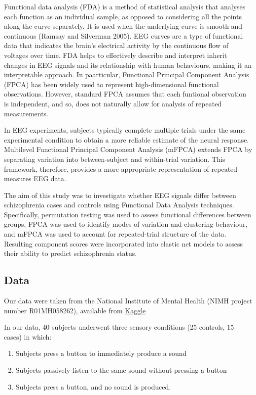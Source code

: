 \documentclass{article}
\providecommand{\tightlist}{%
  \setlength{\itemsep}{0pt}\setlength{\parskip}{0pt}}
\begin{document}
Functional data analysis (FDA) is a method of statistical analysis that
analyses each function as an individual sample, as opposed to
considering all the points along the curve separately. It is used when
the underlying curve is smooth and continuous (Ramsay and Silverman
2005). EEG curves are a type of functional data that indicates the
brain's electrical activity by the continuous flow of voltages over
time. FDA helps to effectively describe and interpret inherit changes in
EEG signals and its relationship with human behaviours, making it an
interpretable approach. In paarticular, Functional Principal Component
Analysis (FPCA) has been widely used to represent high-dimensional
functional observations. However, standard FPCA assumes that each
funtional observation is independent, and so, does not naturally allow
for analysis of repeated measurements.

In EEG experiments, subjects typically complete multiple trials under
the same experimental condition to obtain a more reliable estimate of
the neural response. Multilevel Functional Principal Component Analysis
(mFPCA) extends FPCA by separating variation into between-subject and
within-trial variation. This framework, therefore, provides a more
appropriate representation of repeated-measures EEG data.

The aim of this study was to investigate whether EEG signals differ
between schizophrenia cases and controls using Functional Data Analysis
techniques. Specifically, permutation testing was used to assess
functional differences between groups, FPCA was used to identify modes
of variation and clustering behaviour, and mFPCA was used to account for
repeated-trial structure of the data. Resulting component scores were
incorporated into elastic net models to assess their ability to predict
schizophrenia status.

\subsection{Data}\label{data}

Our data were taken from the National Institute of Mental Health (NIMH
project number R01MH058262), available from
\href{www.kaggle.com/datasets/broach/button-tone-sz/data}{Kaggle}

In our data, 40 subjects underwent three sensory conditions (25
controls, 15 cases) in which:

\begin{enumerate}
\def\labelenumi{\arabic{enumi}.}
\tightlist
\item
  Subjects press a button to immediately produce a sound
\item
  Subjects passively listen to the same sound without pressing a button
\item
  Subjects press a button, and no sound is produced.
\end{enumerate}
\end{document}
